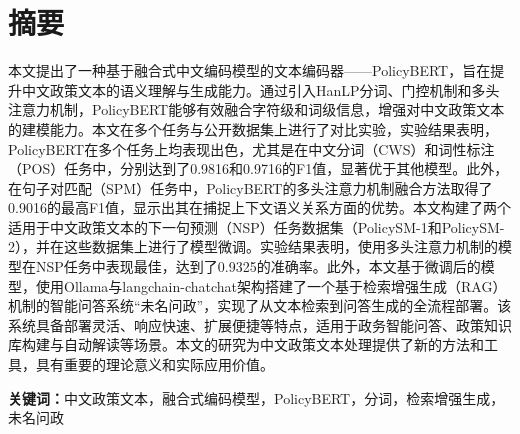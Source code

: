 \documentclass[12pt, a4paper]{ctexart}
\begin{document}
\section*{摘要}
本文提出了一种基于融合式中文编码模型的文本编码器——PolicyBERT，旨在提升中文政策文本的语义理解与生成能力。通过引入HanLP分词、门控机制和多头注意力机制，PolicyBERT能够有效融合字符级和词级信息，增强对中文政策文本的建模能力。本文在多个任务与公开数据集上进行了对比实验，实验结果表明，PolicyBERT在多个任务上均表现出色，尤其是在中文分词（CWS）和词性标注（POS）任务中，分别达到了0.9816和0.9716的F1值，显著优于其他模型。此外，在句子对匹配（SPM）任务中，PolicyBERT的多头注意力机制融合方法取得了0.9016的最高F1值，显示出其在捕捉上下文语义关系方面的优势。本文构建了两个适用于中文政策文本的下一句预测（NSP）任务数据集（PolicySM-1和PolicySM-2），并在这些数据集上进行了模型微调。实验结果表明，使用多头注意力机制的模型在NSP任务中表现最佳，达到了0.9325的准确率。此外，本文基于微调后的模型，使用Ollama与langchain-chatchat架构搭建了一个基于检索增强生成（RAG）机制的智能问答系统“未名问政”，实现了从文本检索到问答生成的全流程部署。该系统具备部署灵活、响应快速、扩展便捷等特点，适用于政务智能问答、政策知识库构建与自动解读等场景。本文的研究为中文政策文本处理提供了新的方法和工具，具有重要的理论意义和实际应用价值。

\vspace{2em} %

\textbf{关键词：}中文政策文本，融合式编码模型，PolicyBERT，分词，检索增强生成，未名问政
\vspace{2em} %

\newpage
\end{document}
